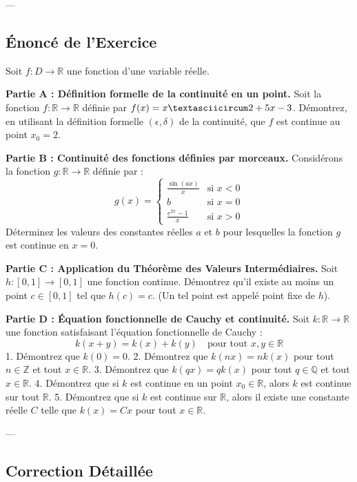 \documentclass[12pt,a4paper]{report}
\begin{document}
---

\subsection{Énoncé de l'Exercice}

Soit $f: D \to \mathbb{R}$ une fonction d'une variable réelle.

\textbf{Partie A : Définition formelle de la continuité en un point.}
Soit la fonction $f: \mathbb{R} \to \mathbb{R}$ définie par $f(x) = x\textasciicircum 2 + 5x - 3$.
Démontrez, en utilisant la définition formelle $(\epsilon, \delta)$ de la continuité, que $f$ est continue au point $x_0 = 2$.

\textbf{Partie B : Continuité des fonctions définies par morceaux.}
Considérons la fonction $g: \mathbb{R} \to \mathbb{R}$ définie par :
$$
g(x) = \begin{cases}
    \frac{\sin(ax)}{x} & \text{si } x < 0 \\
    b & \text{si } x = 0 \\
    \frac{e^{2x}-1}{x} & \text{si } x > 0
\end{cases}
$$
Déterminez les valeurs des constantes réelles $a$ et $b$ pour lesquelles la fonction $g$ est continue en $x=0$.

\textbf{Partie C : Application du Théorème des Valeurs Intermédiaires.}
Soit $h: [0,1] \to [0,1]$ une fonction continue.
Démontrez qu'il existe au moins un point $c \in [0,1]$ tel que $h(c) = c$. (Un tel point est appelé point fixe de $h$).

\textbf{Partie D : Équation fonctionnelle de Cauchy et continuité.}
Soit $k: \mathbb{R} \to \mathbb{R}$ une fonction satisfaisant l'équation fonctionnelle de Cauchy :
$$
k(x+y) = k(x) + k(y) \quad \text{pour tout } x, y \in \mathbb{R}
$$
1.  Démontrez que $k(0) = 0$.
2.  Démontrez que $k(nx) = nk(x)$ pour tout $n \in \mathbb{Z}$ et tout $x \in \mathbb{R}$.
3.  Démontrez que $k(qx) = qk(x)$ pour tout $q \in \mathbb{Q}$ et tout $x \in \mathbb{R}$.
4.  Démontrez que si $k$ est continue en un point $x_0 \in \mathbb{R}$, alors $k$ est continue sur tout $\mathbb{R}$.
5.  Démontrez que si $k$ est continue sur $\mathbb{R}$, alors il existe une constante réelle $C$ telle que $k(x) = Cx$ pour tout $x \in \mathbb{R}$.

---

\subsection{Correction Détaillée}
\end{document}
